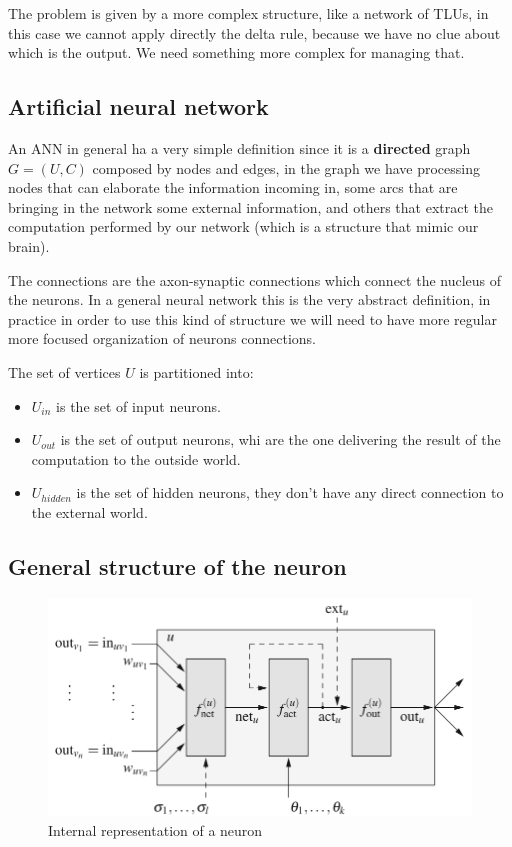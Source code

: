 \documentclass{article}
\begin{document}
The problem is given by a more complex structure, like a network of TLUs,
in this case we cannot apply directly the delta rule, because we have no clue
about which is the output. We need something more complex for managing that.

\subsection{Artificial neural network}
An ANN in general ha a very simple definition since it is a \textbf{directed}
graph $G=(U,C)$ composed by nodes and edges, in the graph we have processing
nodes that can elaborate the information incoming in, some arcs that
are bringing in the network some external information, and others that extract
the computation performed by our network (which is a structure that mimic our
brain).

The connections are the axon-synaptic connections which connect the nucleus of the
neurons. In a general neural network this is the very abstract definition, in practice
in order to use this kind of structure we will need to have more regular more focused
organization of neurons connections.

The set of vertices $U$ is partitioned into:
\begin{itemize}
    \item $U_{in}$ is the set of input neurons.
    \item $U_{out}$ is the set of output neurons, whi are the one delivering the
          result of the computation to the outside world.
    \item $U_{hidden}$ is the set of hidden neurons, they don't have any direct
          connection to the external world.
\end{itemize}

\subsection{General structure of the neuron}

\begin{figure}[H]
    \centering
    \includegraphics[scale=0.5]{images/general_structure_neuron.png}
    \caption{Internal representation of a neuron}
\end{figure}
\end{document}
